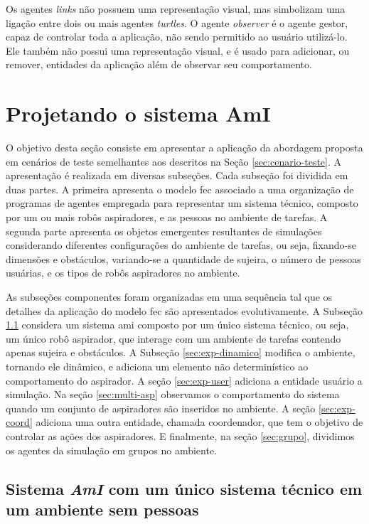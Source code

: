 Os agentes \textit{links} não possuem uma representação visual, mas simbolizam uma ligação entre dois ou mais agentes \textit{turtles}. O agente \textit{observer} é o agente gestor, capaz de controlar toda a aplicação, não sendo permitido ao usuário utilizá-lo. Ele também não possui uma representação visual, e é usado para adicionar, ou remover, entidades da aplicação além de observar seu comportamento. 

\section{Projetando o sistema AmI}
\label{sec:dev-experimento}

O objetivo desta seção consiste em apresentar a aplicação da abordagem proposta em cenários de teste semelhantes aos descritos na Seção \ref{sec:cenario-teste}. A apresentação é realizada em diversas subseções. Cada subseção foi dividida em duas partes. A primeira apresenta o modelo \acrshort{fec} associado a uma organização de programas de agentes empregada para representar um sistema técnico, composto por um ou mais robôs aspiradores, e as pessoas no ambiente de tarefas. A segunda parte apresenta os objetos emergentes resultantes de simulações considerando diferentes configurações do ambiente de tarefas, ou seja, fixando-se dimensões e obstáculos, variando-se a quantidade de sujeira, o número de pessoas usuárias, e os tipos de robôs aspiradores no ambiente.

As subseções componentes foram organizadas em uma sequência tal que os detalhes da aplicação do modelo \acrshort{fec} são apresentados evolutivamente. A Subseção \ref{subsec:exp1} considera um sistema \acrshort{ami} composto por um único sistema técnico, ou seja, um único robô aspirador, que interage com um ambiente de tarefas contendo apenas sujeira e obstáculos. A Subseção \ref{sec:exp-dinamico} modifica o ambiente, tornando ele dinâmico, e adiciona um elemento não determinístico ao comportamento do aspirador. A seção \ref{sec:exp-user} adiciona a entidade usuário a simulação. Na seção \ref{sec:multi-asp} observamos o comportamento do sistema quando um conjunto de aspiradores são inseridos no ambiente. A seção \ref{sec:exp-coord} adiciona uma outra entidade, chamada coordenador, que tem o objetivo de controlar as ações dos aspiradores. E finalmente, na seção \ref{sec:grupo}, dividimos os agentes da simulação em grupos no ambiente.

\subsection{Sistema \textit{AmI} com um único sistema técnico em um ambiente sem pessoas}
\label{subsec:exp1}

